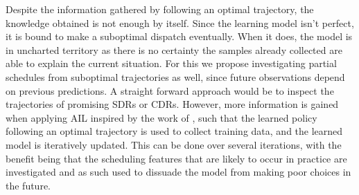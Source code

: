 \documentclass[twocolumn]{svjour3}
\begin{document}
Despite the information gathered by following an optimal trajectory, the 
knowledge obtained is not enough by itself. Since the learning model isn't 
perfect, it is bound to make a suboptimal dispatch eventually. 
When it does, the model is in uncharted territory as there is no certainty the 
samples already collected are able to explain the current situation. 
For this we propose investigating partial schedules from suboptimal 
trajectories as well, since future observations depend on previous 
predictions. 
A straight forward approach would be to inspect the trajectories of promising 
SDRs or CDRs. However, more information is gained when applying AIL inspired by 
the work of \cite{RossB10,RossGB11}, such that the 
learned policy following an optimal trajectory is used to collect training 
data, and the learned model is iteratively updated. 
This can be done over several iterations, with the benefit being that the 
scheduling features that are likely to occur in practice are investigated and 
as such used to dissuade the model from making poor choices in the future.
 
\end{document}
